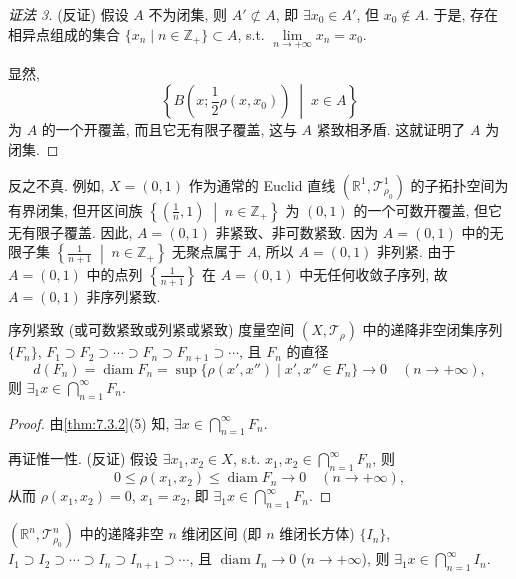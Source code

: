 \begin{proof}[证法 3]
(反证) 假设 $A$ 不为闭集, 则 $A' \not\subset A$, 即 $\exists x_{0} \in A'$, 但 $x_{0} \notin A$. 于是, 存在相异点组成的集合 $\{x_{n} \mid n \in \mathbb{Z}_{+}\} \subset A$, s.t. $\lim\limits_{n \to +\infty} x_{n} = x_{0}$.

显然,
\[
  \left\{B\left(x; \frac{1}{2}\rho(x, x_{0})\right) \;\middle|\; x \in A\right\}
\]
为 $A$ 的一个开覆盖, 而且它无有限子覆盖, 这与 $A$ 紧致相矛盾. 这就证明了 $A$ 为闭集.
\end{proof}

反之不真. 例如, $X = (0, 1)$ 作为通常的 Euclid 直线 $(\mathbb{R}^{1}, \mathcal{T}_{\rho_{0}}^{1})$ 的子拓扑空间为有界闭集, 但开区间族 $\left\{\left(\frac{1}{n}, 1\right) \;\middle|\; n \in \mathbb{Z}_{+}\right\}$ 为 $(0, 1)$ 的一个可数开覆盖, 但它无有限子覆盖. 因此, $A = (0, 1)$ 非紧致、非可数紧致. 因为 $A = (0, 1)$ 中的无限子集 $\left\{\frac{1}{n+1} \;\middle|\; n \in \mathbb{Z}_{+}\right\}$ 无聚点属于 $A$, 所以 $A = (0, 1)$ 非列紧. 由于 $A = (0, 1)$ 中的点列 $\left\{\frac{1}{n+1}\right\}$ 在 $A = (0, 1)$ 中无任何收敛子序列, 故 $A = (0, 1)$ 非序列紧致.

\begin{theorem}[闭集套原理]\label{thm:7.3.4}
序列紧致 (或可数紧致或列紧或紧致) 度量空间 $(X, \mathcal{T}_{\rho})$ 中的递降非空闭集序列 $\{F_{n}\}$, $F_{1} \supset F_{2} \supset \cdots \supset F_{n} \supset F_{n+1} \supset \cdots$, 且 $F_{n}$ 的直径
\[
  d(F_{n}) = \operatorname{diam} F_{n} = \sup\{\rho(x', x'') \mid x', x'' \in F_{n}\} \to 0 \quad (n \to +\infty),
\]
则 $\exists_{1} x \in \bigcap\limits_{n=1}^{\infty} F_{n}$.
\end{theorem}

\begin{proof}
由\cref{thm:7.3.2}(5) 知, $\exists x \in \bigcap\limits_{n=1}^{\infty} F_{n}$.

再证惟一性. (反证) 假设 $\exists x_{1}, x_{2} \in X$, s.t. $x_{1}, x_{2} \in \bigcap\limits_{n=1}^{\infty} F_{n}$, 则
\[
  0 \leqslant \rho(x_{1}, x_{2}) \leqslant \operatorname{diam} F_{n} \to 0 \quad (n \to +\infty),
\]
从而 $\rho(x_{1}, x_{2}) = 0$, $x_{1} = x_{2}$, 即 $\exists_{1} x \in \bigcap\limits_{n=1}^{\infty} F_{n}$.
\end{proof}

\begin{corollary}\label{cor:7.3.1}
$(\mathbb{R}^{n}, \mathcal{T}_{\rho_{0}}^{n})$ 中的递降非空 $n$ 维闭区间 (即 $n$ 维闭长方体) $\{I_{n}\}$, $I_{1} \supset I_{2} \supset \cdots \supset I_{n} \supset I_{n+1} \supset \cdots$, 且 $\operatorname{diam} I_{n} \to 0$ ($n \to +\infty$), 则 $\exists_{1} x \in \bigcap\limits_{n=1}^{\infty} I_{n}$.
\end{corollary}

